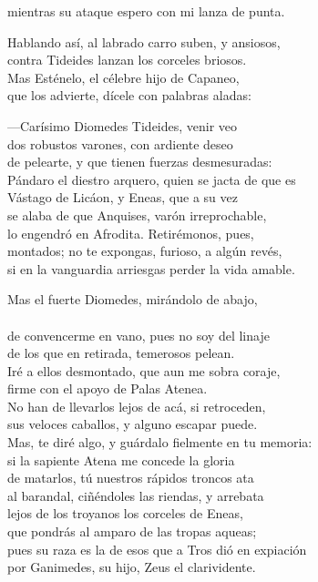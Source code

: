 mientras su ataque espero con mi lanza de punta.\par
Hablando así, al labrado carro suben, y ansiosos,\\
contra Tideides lanzan los corceles briosos.\\
Mas Esténelo, el célebre hijo de Capaneo,\\
que los advierte, dícele con palabras aladas:\par
---Carísimo Diomedes Tideides, venir veo\\
dos robustos varones, con ardiente deseo\\
de pelearte, y que tienen fuerzas desmesuradas:\\
Pándaro el diestro arquero, quien se jacta de que es\\
Vástago de Licáon, y Eneas, que a su vez\\
se alaba de que Anquises, varón irreprochable,\\
lo engendró en Afrodita. Retirémonos, pues,\\
montados; no te expongas, furioso, a algún revés,\\
si en la vanguardia arriesgas perder la vida amable.\par
Mas el fuerte Diomedes, mirándolo de abajo,\\
\\
de convencerme en vano, pues no soy del linaje\\
de los que en retirada, temerosos pelean.\\
Iré a ellos desmontado, que aun me sobra coraje,\\
firme con el apoyo de Palas Atenea.\\
No han de llevarlos lejos de acá, si retroceden,\\
sus veloces caballos, y alguno escapar puede.\\
Mas, te diré algo, y guárdalo fielmente en tu memoria:\\
si la sapiente Atena me concede la gloria\\
de matarlos, tú nuestros rápidos troncos ata\\
al barandal, ciñéndoles las riendas, y arrebata\\
lejos de los troyanos los corceles de Eneas,\\
que pondrás al amparo de las tropas aqueas;\\
pues su raza es la de esos que a Tros dió en expiación\\
por Ganimedes, su hijo, Zeus el clarividente.\\
